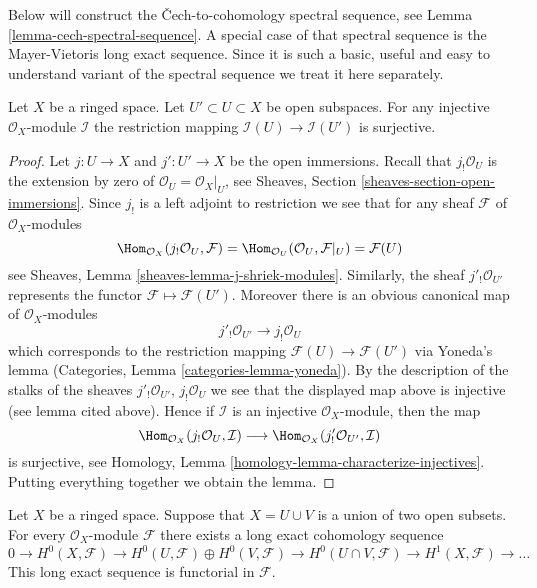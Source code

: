 \noindent
Below will construct the {\v C}ech-to-cohomology spectral sequence, see
Lemma \ref{lemma-cech-spectral-sequence}.
A special case of that spectral sequence is the Mayer-Vietoris
long exact sequence. Since it is such a basic, useful and easy to understand
variant of the spectral sequence we treat it here separately.

\begin{lemma}
\label{lemma-injective-restriction-surjective}
Let $X$ be a ringed space.
Let $U' \subset U \subset X$ be open subspaces.
For any injective $\mathcal{O}_X$-module $\mathcal{I}$ the
restriction mapping
$\mathcal{I}(U) \to \mathcal{I}(U')$ is surjective.
\end{lemma}

\begin{proof}
Let $j : U \to X$ and $j' : U' \to X$ be the open immersions.
Recall that $j_!\mathcal{O}_U$ is the extension by zero of
$\mathcal{O}_U = \mathcal{O}_X|_U$, see
Sheaves, Section \ref{sheaves-section-open-immersions}.
Since $j_!$ is a left adjoint to restriction we see that
for any sheaf $\mathcal{F}$ of $\mathcal{O}_X$-modules
$$
\Hom_{\mathcal{O}_X}(j_!\mathcal{O}_U, \mathcal{F})
=
\Hom_{\mathcal{O}_U}(\mathcal{O}_U, \mathcal{F}|_U)
=
\mathcal{F}(U)
$$
see Sheaves, Lemma \ref{sheaves-lemma-j-shriek-modules}.
Similarly, the sheaf $j'_!\mathcal{O}_{U'}$ represents the
functor $\mathcal{F} \mapsto \mathcal{F}(U')$.
Moreover there
is an obvious canonical map of $\mathcal{O}_X$-modules
$$
j'_!\mathcal{O}_{U'} \longrightarrow j_!\mathcal{O}_U
$$
which corresponds to the restriction mapping
$\mathcal{F}(U) \to \mathcal{F}(U')$ via Yoneda's lemma
(Categories, Lemma \ref{categories-lemma-yoneda}). By the description
of the stalks of the sheaves
$j'_!\mathcal{O}_{U'}$, $j_!\mathcal{O}_U$
we see that the displayed map above is injective (see lemma cited above).
Hence if $\mathcal{I}$ is an injective $\mathcal{O}_X$-module,
then the map
$$
\Hom_{\mathcal{O}_X}(j_!\mathcal{O}_U, \mathcal{I})
\longrightarrow
\Hom_{\mathcal{O}_X}(j'_!\mathcal{O}_{U'}, \mathcal{I})
$$
is surjective, see
Homology, Lemma \ref{homology-lemma-characterize-injectives}.
Putting everything together we obtain the lemma.
\end{proof}

\begin{lemma}
\label{lemma-mayer-vietoris}
Let $X$ be a ringed space. Suppose that $X = U \cup V$ is a
union of two open subsets. For every $\mathcal{O}_X$-module $\mathcal{F}$
there exists a long exact cohomology sequence
$$
0 \to
H^0(X, \mathcal{F}) \to
H^0(U, \mathcal{F}) \oplus H^0(V, \mathcal{F}) \to
H^0(U \cap V, \mathcal{F}) \to
H^1(X, \mathcal{F}) \to \ldots
$$
This long exact sequence is functorial in $\mathcal{F}$.
\end{lemma}

